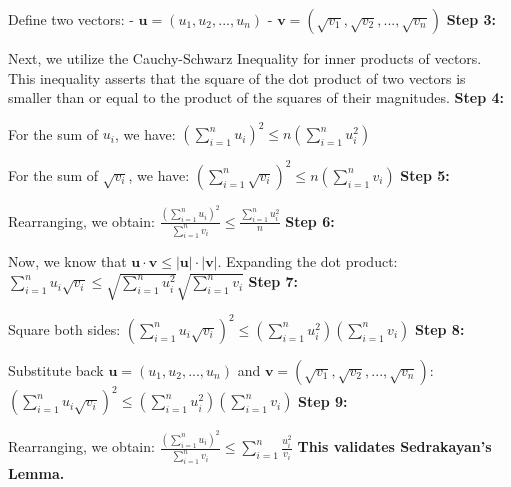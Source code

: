 \documentclass{article}
\begin{document}
\begin{flushleft}
Define two vectors:
   - $\mathbf{u} = (u_1, u_2, ..., u_n)$
   - $\mathbf{v} = (\sqrt{v_1}, \sqrt{v_2}, ..., \sqrt{v_n})$
\newline\newline
\textbf{Step 3:}

Next, we utilize the Cauchy-Schwarz Inequality for inner products of vectors. This inequality asserts that the square of the dot product of two vectors is smaller than or equal to the product of the squares of their magnitudes.
\newline\newline
\textbf{Step 4:}

For the sum of $u_i$, we have:
$(\sum_{i=1}^n u_i)^2 \leq n (\sum_{i=1}^n u_i^2)$

For the sum of $\sqrt{v_i}$, we have:
$(\sum_{i=1}^n \sqrt{v_i})^2 \leq n (\sum_{i=1}^n v_i)$
\newline\newline
\textbf{Step 5:}

Rearranging, we obtain:
$\frac{(\sum_{i=1}^n u_i)^2}{\sum_{i=1}^n v_i} \leq \frac{\sum_{i=1}^n u_i^2}{n}$
\newline\newline
\textbf{Step 6:}

Now, we know that $\mathbf{u} \cdot \mathbf{v} \leq |\mathbf{u}| \cdot |\mathbf{v}|$. Expanding the dot product:
$\sum_{i=1}^n u_i \sqrt{v_i} \leq \sqrt{\sum_{i=1}^n u_i^2} \sqrt{\sum_{i=1}^n v_i}$
\newline\newline
\textbf{Step 7:}

Square both sides:
$(\sum_{i=1}^n u_i \sqrt{v_i})^2 \leq (\sum_{i=1}^n u_i^2)(\sum_{i=1}^n v_i)$
\newline\newline
\textbf{Step 8:}

Substitute back $\mathbf{u} = (u_1, u_2, ..., u_n)$ and $\mathbf{v} = (\sqrt{v_1}, \sqrt{v_2}, ..., \sqrt{v_n})$:
$\left(\sum_{i=1}^n u_i \sqrt{v_i}\right)^2 \leq \left(\sum_{i=1}^n u_i^2\right) \left(\sum_{i=1}^n v_i\right)$
\newline\newline
\textbf{Step 9:}

Rearranging, we obtain:
$\frac{(\sum_{i=1}^n u_i)^2}{\sum_{i=1}^n v_i} \leq \sum_{i=1}^n \frac{u_i^2}{v_i}$
\newline\newline
\textbf{This validates Sedrakayan's Lemma.}

\end{flushleft}
\end{document}
